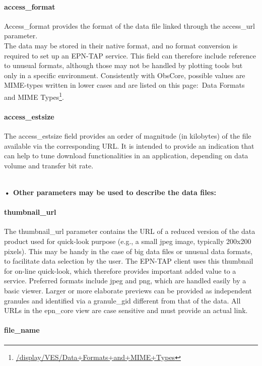 \documentclass[11pt,a4paper]{ivoa}
\begin{document}
\paragraph{access\_format}

Access\_format provides the format of the data file linked through the access\_url parameter. \\The data may be stored in their native format, and no format conversion is required to set up an EPN-TAP service. This field can therefore include reference to unusual formats, although those may not be handled by plotting tools but only in a specific environment. Consistently with ObsCore, possible values are MIME-types written in lower cases and are listed on this page: Data Formats and MIME Types\footnote{\url{/display/VES/Data+Formats+and+MIME+Types}}.

\paragraph{access\_estsize}

The access\_estsize field provides an order of magnitude (in kilobytes) of the file available via the corresponding URL. It is intended to provide an indication that can help to tune download functionalities in an application, depending on data volume and transfer bit rate.

\\

\textbf{• Other parameters may be used to describe the data files:}

\paragraph{thumbnail\_url}

The thumbnail\_url parameter contains the URL of a reduced version of the data product used for quick-look purpose (e.g., a small jpeg image, typically 200x200 pixels). This may be handy in the case of big data files or unusual data formats, to facilitate data selection by the user. The EPN-TAP client uses this thumbnail for on-line quick-look, which therefore provides important added value to a service. Preferred formats include jpeg and png, which are handled easily by a basic viewer. Larger or more elaborate previews can be provided as independent granules and identified via a granule\_gid different from that of the data. All URLs in the epn\_core view are case sensitive and must provide an actual link.

\paragraph{file\_name}
\end{document}
